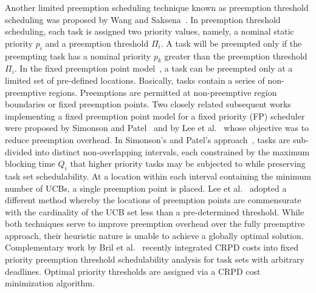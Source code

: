 Another limited preemption scheduling technique known as preemption threshold scheduling was proposed by Wang and Saksena~\cite{wang:99}.  In preemption threshold scheduling, each task is assigned two priority values, namely, a nominal static priority \begin{math}p_{i}\end{math} and a preemption threshold \begin{math}\Pi_{i}\end{math}.  A task will be preempted only if the preempting task has a nominal priority \begin{math}p_{k}\end{math} greater than the preemption threshold \begin{math}\Pi_{i}\end{math}. In the fixed preemption point model~\cite{burns:05}, a task can be preempted only at a limited set of pre-defined locations. Basically, tasks contain a series of non-preemptive regions.  Preemptions are permitted at non-preemptive region boundaries or fixed preemption points.
\newline
\indent
Two closely related subsequent works implementing a fixed preemption point model for a fixed priority (FP) scheduler were proposed by Simonson and Patel~\cite{simonson:95} and by Lee et al.~\cite{lee:98} whose objective was to reduce preemption overhead.  In Simonson’s and Patel’s approach~\cite{simonson:95}, tasks are sub-divided into distinct non-overlapping intervals, each constrained by the maximum blocking time \begin{math}Q_{i}\end{math} that higher priority tasks may be subjected to while preserving task set schedulability.  At a location within each interval containing the minimum number of UCBs, a single preemption point is placed.  Lee et al.~\cite{lee:98} adopted a different method whereby the locations of preemption points are commensurate with the cardinality of the UCB set less than a pre-determined threshold.   While both techniques serve to improve preemption overhead over the fully preemptive approach, their heuristic nature is unable to achieve a globally optimal solution.  Complementary work by Bril et al.~\cite{bril:14} recently integrated CRPD costs into fixed priority preemption threshold schedulability analysis for task sets with arbitrary deadlines.  Optimal priority thresholds are assigned via a CRPD cost minimization algorithm.
\newline
\indent
